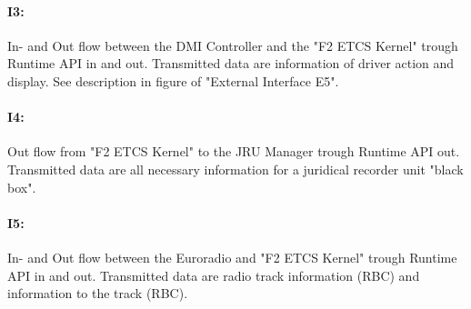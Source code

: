 \paragraph{I3:} In- and Out flow between the DMI Controller and the "F2 ETCS Kernel" trough Runtime API in and out. Transmitted data are information of driver action and display. See description in figure of "External Interface E5".

\paragraph{I4:} Out flow from "F2 ETCS Kernel" to the JRU Manager trough Runtime API out. Transmitted data are all necessary information for a juridical recorder unit "black box".

\paragraph{I5:} In- and Out flow between the Euroradio and "F2 ETCS Kernel" trough Runtime API in and out. Transmitted data are radio track information (RBC) and information to the track (RBC). 

